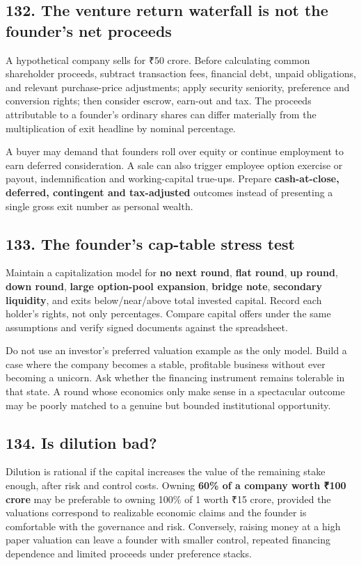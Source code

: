 \subsection{132. The venture return waterfall is not the founder's net proceeds}


A hypothetical company sells for ₹50 crore. Before calculating common shareholder proceeds, subtract transaction fees, financial debt, unpaid obligations, and relevant purchase-price adjustments; apply security seniority, preference and conversion rights; then consider escrow, earn-out and tax. The proceeds attributable to a founder's ordinary shares can differ materially from the multiplication of exit headline by nominal percentage.

A buyer may demand that founders roll over equity or continue employment to earn deferred consideration. A sale can also trigger employee option exercise or payout, indemnification and working-capital true-ups. Prepare \textbf{cash-at-close, deferred, contingent and tax-adjusted} outcomes instead of presenting a single gross exit number as personal wealth.

\subsection{133. The founder's cap-table stress test}


Maintain a capitalization model for \textbf{no next round}, \textbf{flat round}, \textbf{up round}, \textbf{down round}, \textbf{large option-pool expansion}, \textbf{bridge note}, \textbf{secondary liquidity}, and exits below/near/above total invested capital. Record each holder's rights, not only percentages. Compare capital offers under the same assumptions and verify signed documents against the spreadsheet.

Do not use an investor's preferred valuation example as the only model. Build a case where the company becomes a stable, profitable business without ever becoming a unicorn. Ask whether the financing instrument remains tolerable in that state. A round whose economics only make sense in a spectacular outcome may be poorly matched to a genuine but bounded institutional opportunity.

\subsection{134. Is dilution bad?}


Dilution is rational if the capital increases the value of the remaining stake enough, after risk and control costs. Owning \textbf{60\% of a company worth ₹100 crore} may be preferable to owning 100\% of 1 worth ₹15 crore, provided the valuations correspond to realizable economic claims and the founder is comfortable with the governance and risk. Conversely, raising money at a high paper valuation can leave a founder with smaller control, repeated financing dependence and limited proceeds under preference stacks.

